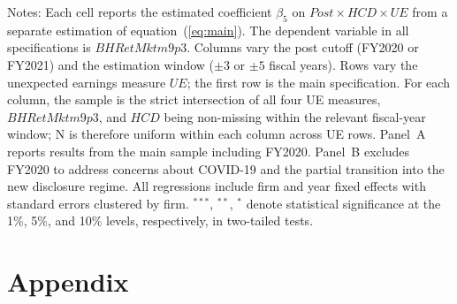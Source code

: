\documentclass[12pt]{article}
\begin{document}
\begin{table}[ht]
\begin{threeparttable}
\begin{tablenotes}
\item Notes: Each cell reports the estimated coefficient $\beta_5$ on $Post \times HCD \times UE$ from a separate estimation of equation~(\ref{eq:main}). The dependent variable in all specifications is $BHRetMktm9p3$. Columns vary the post cutoff (FY2020 or FY2021) and the estimation window ($\pm 3$ or $\pm 5$ fiscal years). Rows vary the unexpected earnings measure $UE$; the first row is the main specification. For each column, the sample is the strict intersection of all four UE measures, $BHRetMktm9p3$, and $HCD$ being non-missing within the relevant fiscal-year window; N is therefore uniform within each column across UE rows. Panel~A reports results from the main sample including FY2020. Panel~B excludes FY2020 to address concerns about COVID-19 and the partial transition into the new disclosure regime. All regressions include firm and year fixed effects with standard errors clustered by firm. $^{***}$, $^{**}$, $^{*}$ denote statistical significance at the 1\%, 5\%, and 10\% levels, respectively, in two-tailed tests.
\end{tablenotes}
\end{threeparttable}
\end{table}


\clearpage
\section*{Appendix}
\renewcommand{\thetable}{A\arabic{table}}
\setcounter{table}{0}
\end{document}
